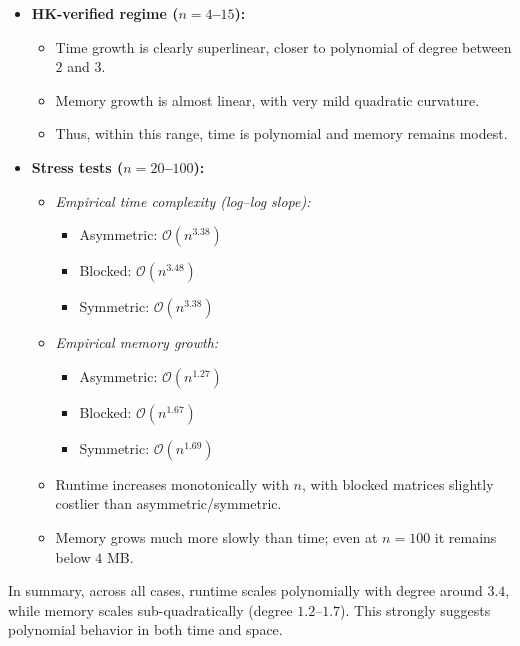 \documentclass[sn-mathphys]{article}
\theoremstyle{thmstyleone}%
\theoremstyle{thmstyletwo}%
\theoremstyle{thmstylethree}%
\begin{document}
\begin{itemize}
    \item \textbf{HK-verified regime ($n=4$–$15$):}
    \begin{itemize}
        \item Time growth is clearly superlinear, closer to polynomial of degree
              between $2$ and $3$.
        \item Memory growth is almost linear, with very mild quadratic curvature.
        \item Thus, within this range, time is polynomial and memory remains
              modest.
    \end{itemize}
    
    \item \textbf{Stress tests ($n=20$–$100$):}
    \begin{itemize}
        \item \emph{Empirical time complexity (log–log slope):}
              \begin{itemize}
                  \item Asymmetric: $\mathcal{O}(n^{3.38})$
                  \item Blocked: $\mathcal{O}(n^{3.48})$
                  \item Symmetric: $\mathcal{O}(n^{3.38})$
              \end{itemize}
        \item \emph{Empirical memory growth:}
              \begin{itemize}
                  \item Asymmetric: $\mathcal{O}(n^{1.27})$
                  \item Blocked: $\mathcal{O}(n^{1.67})$
                  \item Symmetric: $\mathcal{O}(n^{1.69})$
              \end{itemize}
        \item Runtime increases monotonically with $n$, with blocked matrices
              slightly costlier than asymmetric/symmetric.
        \item Memory grows much more slowly than time; even at $n=100$ it
              remains below $4$ MB.
    \end{itemize}
\end{itemize}

In summary, across all cases, runtime scales polynomially with degree around
$3.4$, while memory scales sub-quadratically (degree $1.2$–$1.7$). This strongly
suggests polynomial behavior in both time and space.
\end{document}
